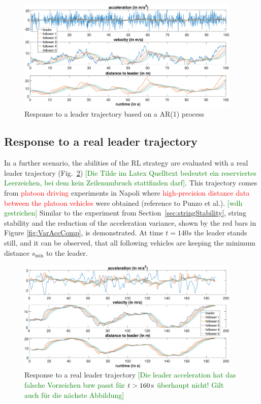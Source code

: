 \documentclass[review]{elsarticle}
\providecommand{\red}[1]{\textcolor{red}{#1}}
\providecommand{\green}[1]{\textcolor{green}{#1}}
\providecommand{\martin}[1]{\red{#1}} %
\providecommand{\martinc}[1]{\green{[#1]}} %
\providecommand{\sub}[1]{_{\mathrm{#1}}}  %
\providecommand{\3}{{\ss}}
\begin{document}
\begin{figure}
	\centering
	\includegraphics[width=0.95\textwidth]{images/AR1Kolonne}
	\caption{Response to a leader trajectory based on a AR(1) process}
	\label{fig:AR1Kolonne}
\end{figure}


\subsection{Response to a real leader trajectory}

In a further scenario, the abilities of the RL strategy are evaluated
with a real leader trajectory (Fig.~\ref{fig:PunzoKolonne})
\martinc{Die Tilde im Latex Quelltext bedeutet ein reserviertes
  Leerzeichen, bei dem kein Zeilenumbruch stattfinden darf}. This
trajectory comes from \martin{platoon driving} experiments in Napoli
where \martin{high-precision distance data between the platoon
vehicles} were obtained (reference to Punzo et al.). \martinc{wdh
  gestrichen} Similar to the experiment from
Section~\ref{sec:stringStability}, string stability and the reduction
of  the acceleration variance, shown by the red bars in Figure
\ref{fig:VarAccComp}, is demonstrated. At time $t = 140s$ the leader
stands still, and it can be observed, that all following vehicles are
keeping the minimum distance $s\sub{min}$ to the leader.  


\begin{figure}
	\centering
	\includegraphics[width=0.95\textwidth]{images/PunzoKolonne}
	\caption{Response to a real leader trajectory \martinc{Die
            leader acceleration hat das falsche Vorzeichen bzw passt
            f\"ur $t>\unit[160]{s}$ \"uberhaupt nicht! Gilt auch f\"ur
        die n\"achste Abbildung}}
	\label{fig:PunzoKolonne}
\end{figure}
\end{document}
